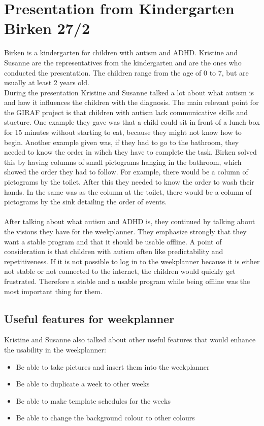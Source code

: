 \section{Presentation from Kindergarten Birken 27/2}
Birken is a kindergarten for children with autism and ADHD.
Kristine and Susanne are the representatives from the kindergarten and are the ones who conducted the presentation.
The children range from the age of 0 to 7, but are usually at least 2 years old.
\\
During the presentation Kristine and Susanne talked a lot about what autism is and how it influences the children with the diagnosis.
The main relevant point for the GIRAF project is that children with autism lack communicative skills and stucture. 
One example they gave was that a child could sit in front of a lunch box for 15 minutes without starting to eat, because they might not know how to begin.
Another example given was, if they had to go to the bathroom, they needed to know the order in wihch they have to complete the task.
Birken solved this by having columns of small pictograms hanging in the bathroom, which showed the order they had to follow. 
For example, there would be a column of pictograms by the toilet.
After this they needed to know the order to wash their hands.
In the same was as the column at the toilet, there would be a column of pictograms by the sink detailing the order of events.
\\\\
After talking about what autism and ADHD is, they continued by talking about the visions they have for the weekplanner.
They emphasize strongly that they want a stable program and that it should be usable offline.
A point of consideration is that children with autism often like predictability and repetitiveness. 
If it is not possible to log in to the weekplanner because it is either not stable or not connected to the internet, the children would quickly get frustrated.
Therefore a stable and a usable program while being offline was the most important thing for them.

\subsection{Useful features for weekplanner}
Kristine and Susanne also talked about other useful features that would enhance the usability in the weekplanner:

\begin{itemize}
    \item Be able to take pictures and insert them into the weekplanner
    \item Be able to duplicate a week to other weeks
    \item Be able to make template schedules for the weeks
    \item Be able to change the background colour to other colours
\end{itemize}

